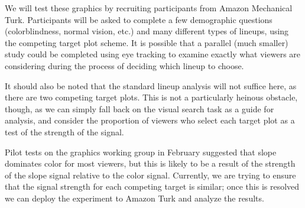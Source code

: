 \documentclass[11pt]{isuthesis}\usepackage[]{graphicx}\usepackage[]{color}
\begin{document}
We will test these graphics by recruiting participants from Amazon Mechanical Turk. Participants will be asked to complete a few demographic questions (colorblindness, normal vision, etc.) and many different types of lineups, using the competing target plot scheme. It is possible that a parallel (much smaller) study could be completed using eye tracking to examine exactly what viewers are considering during the process of deciding which lineup to choose. 

It should also be noted that the standard lineup analysis \citep{majumder2013validation} will not suffice here, as there are two competing target plots. This is not a particularly heinous obstacle, though, as we can simply fall back on the visual search task as a guide for analysis, and consider the proportion of viewers who select each target plot as a test of the strength of the signal. 

Pilot tests on the graphics working group in February suggested that slope dominates color for most viewers, but this is likely to be a result of the strength of the slope signal relative to the color signal. Currently, we are trying to ensure that the signal strength for each competing target is similar; once this is resolved we can deploy the experiment to Amazon Turk and analyze the results. 
% 
% 

\end{document}
